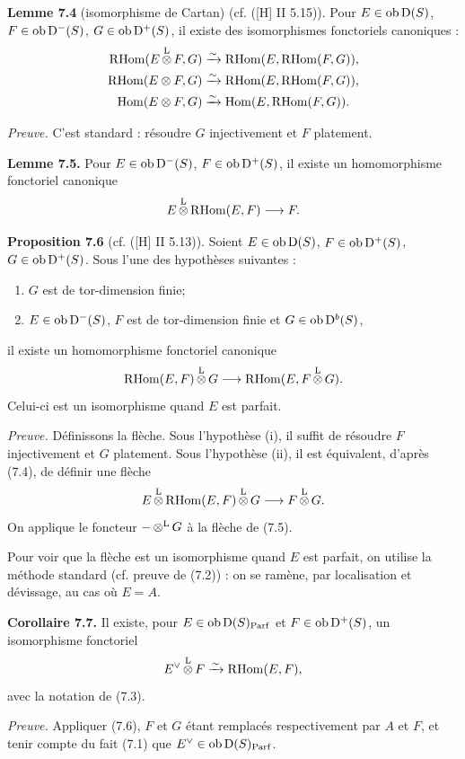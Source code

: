 \documentclass[11pt]{article}
\newcommand{\Parf}{\operatorname{Parf}}
\begin{document}
\textbf{Lemme 7.4} (isomorphisme de Cartan) (cf. ([H] II 5.15)). Pour \(E\in\operatorname{ob}\mathrm D(S)\), \(F\in\operatorname{ob}\mathrm D^-(S)\), \(G\in\operatorname{ob}\mathrm D^+(S)\), il existe des isomorphismes fonctoriels canoniques :
\[
\begin{aligned}
\mathrm R\!\operatorname{Hom}(E\mathop{\otimes}^{\mathrm L} F,G)&\xrightarrow{\sim}\mathrm R\!\operatorname{Hom}(E,\mathrm R\!\operatorname{Hom}(F,G)),\\
\mathrm R\!\operatorname{Hom}(E\otimes F,G)&\xrightarrow{\sim}\mathrm R\!\operatorname{Hom}(E,\mathrm R\!\operatorname{Hom}(F,G)),\\
\operatorname{Hom}(E\otimes F,G)&\xrightarrow{\sim}\operatorname{Hom}(E,\mathrm R\!\operatorname{Hom}(F,G)).
\end{aligned}
\]

\emph{Preuve.} C'est standard : résoudre \(G\) injectivement et \(F\) platement.

\textbf{Lemme 7.5.} Pour \(E\in\operatorname{ob}\mathrm D^-(S)\), \(F\in\operatorname{ob}\mathrm D^+(S)\), il existe un homomorphisme fonctoriel canonique
\[
  E\mathop{\otimes}^{\mathrm L}\mathrm R\!\operatorname{Hom}(E,F)\longrightarrow F.
\]

\textbf{Proposition 7.6} (cf. ([H] II 5.13)). Soient \(E\in\operatorname{ob}\mathrm D(S)\), \(F\in\operatorname{ob}\mathrm D^+(S)\), \(G\in\operatorname{ob}\mathrm D^+(S)\). Sous l'une des hypothèses suivantes :
\begin{enumerate}[label=(\roman*)]
\item \(G\) est de tor-dimension finie;
\item \(E\in\operatorname{ob}\mathrm D^-(S)\), \(F\) est de tor-dimension finie et \(G\in\operatorname{ob}\mathrm D^b(S)\),
\end{enumerate}
il existe un homomorphisme fonctoriel canonique
\[
  \mathrm R\!\operatorname{Hom}(E,F)\mathop{\otimes}^{\mathrm L} G
  \longrightarrow
  \mathrm R\!\operatorname{Hom}(E,F\mathop{\otimes}^{\mathrm L} G).
\]
Celui-ci est un isomorphisme quand \(E\) est parfait.

\emph{Preuve.} Définissons la flèche. Sous l'hypothèse (i), il suffit de résoudre \(F\) injectivement et \(G\) platement. Sous l'hypothèse (ii), il est équivalent, d'après (7.4), de définir une flèche
\[
  E\mathop{\otimes}^{\mathrm L}\mathrm R\!\operatorname{Hom}(E,F)\mathop{\otimes}^{\mathrm L} G\longrightarrow F\mathop{\otimes}^{\mathrm L} G.
\]
On applique le foncteur \(-\mathop{\otimes}^{\mathrm L} G\) à la flèche de (7.5).

Pour voir que la flèche est un isomorphisme quand \(E\) est parfait, on utilise la méthode standard (cf. preuve de (7.2)) : on se ramène, par localisation et dévissage, au cas où \(E=A\).

\textbf{Corollaire 7.7.} Il existe, pour \(E\in\Ob\Dpx(S)_{\Parf}\) et \(F\in\operatorname{ob}\mathrm D^+(S)\), un isomorphisme fonctoriel
\[
  E^\vee\mathop{\otimes}^{\mathrm L} F\xrightarrow{\sim}\mathrm R\!\operatorname{Hom}(E,F),
\]
avec la notation de (7.3).

\emph{Preuve.} Appliquer (7.6), \(F\) et \(G\) étant remplacés respectivement par \(A\) et \(F\), et tenir compte du fait (7.1) que \(E^\vee\in\Ob\Dpx(S)_{\Parf}\).
\end{document}
